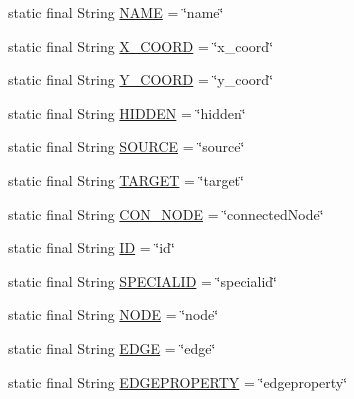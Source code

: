 \begin{DoxyCompactItemize}
\item 
static final String \hyperlink{classorg_1_1tzi_1_1use_1_1gui_1_1xmlparser_1_1_layout_tags_a9abf3d70ede950e50585fd886fbf2ed6}{N\-A\-M\-E} = \char`\"{}name\char`\"{}
\item 
static final String \hyperlink{classorg_1_1tzi_1_1use_1_1gui_1_1xmlparser_1_1_layout_tags_a34a3b4b2ac82ba95d08d594fe74dc7bc}{X\-\_\-\-C\-O\-O\-R\-D} = \char`\"{}x\-\_\-coord\char`\"{}
\item 
static final String \hyperlink{classorg_1_1tzi_1_1use_1_1gui_1_1xmlparser_1_1_layout_tags_a75db3b331a3ad361498d4667dfe91950}{Y\-\_\-\-C\-O\-O\-R\-D} = \char`\"{}y\-\_\-coord\char`\"{}
\item 
static final String \hyperlink{classorg_1_1tzi_1_1use_1_1gui_1_1xmlparser_1_1_layout_tags_ac43212c066a2dac2904695b0ddcf75fb}{H\-I\-D\-D\-E\-N} = \char`\"{}hidden\char`\"{}
\item 
static final String \hyperlink{classorg_1_1tzi_1_1use_1_1gui_1_1xmlparser_1_1_layout_tags_a9ccb74fee3cab41a5cd5f9e8ab43a4d8}{S\-O\-U\-R\-C\-E} = \char`\"{}source\char`\"{}
\item 
static final String \hyperlink{classorg_1_1tzi_1_1use_1_1gui_1_1xmlparser_1_1_layout_tags_aba154c46e6dc876b74f52689bbfd1c03}{T\-A\-R\-G\-E\-T} = \char`\"{}target\char`\"{}
\item 
static final String \hyperlink{classorg_1_1tzi_1_1use_1_1gui_1_1xmlparser_1_1_layout_tags_acef82e81136563cbeaefeca5e17c53c0}{C\-O\-N\-\_\-\-N\-O\-D\-E} = \char`\"{}connected\-Node\char`\"{}
\item 
static final String \hyperlink{classorg_1_1tzi_1_1use_1_1gui_1_1xmlparser_1_1_layout_tags_a1225da77a49d038efc36e01d6e712ba8}{I\-D} = \char`\"{}id\char`\"{}
\item 
static final String \hyperlink{classorg_1_1tzi_1_1use_1_1gui_1_1xmlparser_1_1_layout_tags_aaa49cb31739887fee8ee20765735a5ef}{S\-P\-E\-C\-I\-A\-L\-I\-D} = \char`\"{}specialid\char`\"{}
\item 
static final String \hyperlink{classorg_1_1tzi_1_1use_1_1gui_1_1xmlparser_1_1_layout_tags_a13c186a72b0fd89b66c2790bd1903320}{N\-O\-D\-E} = \char`\"{}node\char`\"{}
\item 
static final String \hyperlink{classorg_1_1tzi_1_1use_1_1gui_1_1xmlparser_1_1_layout_tags_a1f796571c98a8a5bd75a302bdf2f4a19}{E\-D\-G\-E} = \char`\"{}edge\char`\"{}
\item 
static final String \hyperlink{classorg_1_1tzi_1_1use_1_1gui_1_1xmlparser_1_1_layout_tags_a81abbe07631287c9416e3cd21ebf5458}{E\-D\-G\-E\-P\-R\-O\-P\-E\-R\-T\-Y} = \char`\"{}edgeproperty\char`\"{}

\end{DoxyCompactItemize}
